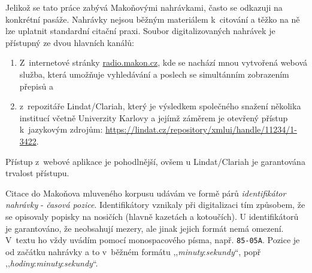 Jelikož se tato práce zabývá Makoňovými nahrávkami, často se odkazuji na
konkrétní pasáže. Nahrávky nejsou běžným materiálem k~citování a těžko na ně lze
uplatnit standardní citační praxi. Soubor digitalizovaných nahrávek je
přístupný ze dvou hlavních kanálů:
\begin{enumerate}
\item{
  Z~internetové stránky \url{radio.makon.cz}, kde se nachází mnou vytvořená
  webová služba, která umožňuje vyhledávání a poslech se simultánním zobrazením
  přepisů a
}
\item{
  z~repozitáře Lindat/Clariah, který je výsledkem společného snažení několika
  institucí včetně Univerzity Karlovy a jejímž záměrem je otevřený přístup
  k~jazykovým zdrojům: \url{https://lindat.cz/repository/xmlui/handle/11234/1-3422}.
}
\end{enumerate}
Přístup z~webové aplikace je pohodlnější, ovšem u Lindat/Clariah je garantována
trvalost přístupu.

Citace do Makoňova mluveného korpusu udávám ve formě párů \textit{identifikátor
nahrávky} - \textit{časová pozice}. Identifikátory vznikaly při digitalizaci tím
způsobem, že se opisovaly popisky na nosičích (hlavně kazetách a kotoučích). U
identifikátorů je garantováno, že neobsahují mezery, ale jinak jejich formát
nemá omezení. V~textu ho vždy uvádím pomocí monospacového písma, např.
\texttt{85-05A}. Pozice je od začátku nahrávky a to v~běžném formátu
,,\textit{minuty}:\textit{sekundy}``, popř
,,\textit{hodiny}:\textit{minuty}:\textit{sekundy}``.
